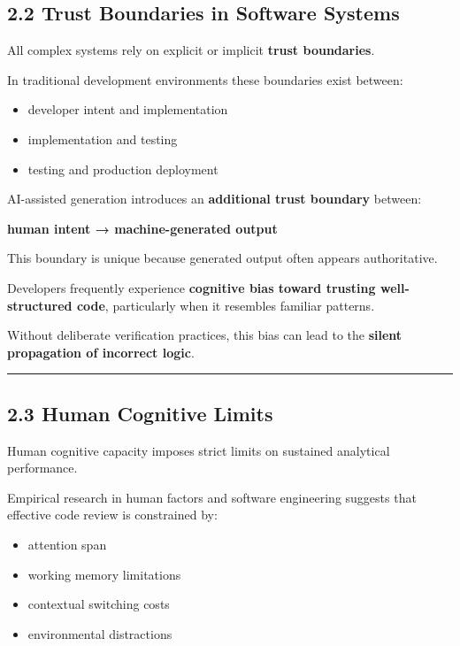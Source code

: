 \documentclass[
]{article}
\providecommand{\tightlist}{%
  \setlength{\itemsep}{0pt}\setlength{\parskip}{0pt}}
\begin{document}
\subsection{2.2 Trust Boundaries in Software
Systems}\label{22-trust-boundaries-in-software-systems}

All complex systems rely on explicit or implicit \textbf{trust
boundaries}.

In traditional development environments these boundaries exist between:

\begin{itemize}
\tightlist
\item
  developer intent and implementation
\item
  implementation and testing
\item
  testing and production deployment
\end{itemize}

AI-assisted generation introduces an \textbf{additional trust boundary}
between:

\textbf{human intent → machine-generated output}

This boundary is unique because generated output often appears
authoritative.

Developers frequently experience \textbf{cognitive bias toward trusting
well-structured code}, particularly when it resembles familiar patterns.

Without deliberate verification practices, this bias can lead to the
\textbf{silent propagation of incorrect logic}.

\begin{center}\rule{0.5\linewidth}{0.5pt}\end{center}

\subsection{2.3 Human Cognitive Limits}\label{23-human-cognitive-limits}

Human cognitive capacity imposes strict limits on sustained analytical
performance.

Empirical research in human factors and software engineering suggests
that effective code review is constrained by:

\begin{itemize}
\tightlist
\item
  attention span
\item
  working memory limitations
\item
  contextual switching costs
\item
  environmental distractions
\end{itemize}
\end{document}
